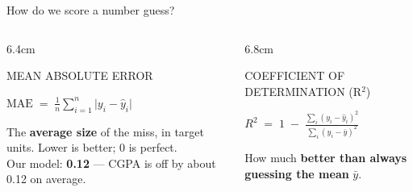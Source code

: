 \documentclass[aspectratio=169,11pt]{beamer}
\providecommand{\lsstyle}{}}
\begin{document}
\begin{frame}{How do we score a number guess?}
  \vspace{0.1em}
  \begin{columns}[T]
    \begin{column}{6.4cm}
      \begin{center}
      {\sffamily\fontsize{8}{10}\selectfont\color{terra}\lsstyle
       MEAN ABSOLUTE ERROR}
      \end{center}
      \vspace{0.1em}
      \begin{center}
        {\fontsize{14}{18}\selectfont
         $\displaystyle \mathrm{MAE} \;=\; \tfrac{1}{n}\sum_{i=1}^{n}
          \bigl| y_i - \hat{y}_i \bigr|$}
      \end{center}
      \vspace{0.1em}
      \begin{center}
      \begin{minipage}{5.8cm}
        {\footnotesize\color{ink}
         The \textbf{average size} of the miss, in target units. Lower is
         better; 0 is perfect.\\[3pt]
         {\color{stone}Our model: \textbf{0.12} --- CGPA is off by about
          0.12 on average.}}
      \end{minipage}
      \end{center}
    \end{column}
    \begin{column}{6.8cm}
      \begin{center}
      {\sffamily\fontsize{8}{10}\selectfont\color{terra}\lsstyle
       COEFFICIENT OF DETERMINATION (R$^2$)}
      \end{center}
      \vspace{0.1em}
      \begin{center}
        {\fontsize{13}{16}\selectfont
         $\displaystyle R^{2} \;=\; 1 \;-\;
          \frac{\sum_i (y_i - \hat{y}_i)^2}{\sum_i (y_i - \bar{y})^2}$}
      \end{center}
      \vspace{0.1em}
      \begin{center}
      \begin{minipage}{6.2cm}
        {\footnotesize\color{ink}
         How much \textbf{better than always guessing the mean} $\bar{y}$.
}
\end{minipage}
\end{center}
\end{column}
\end{columns}
\end{frame}
\end{document}
